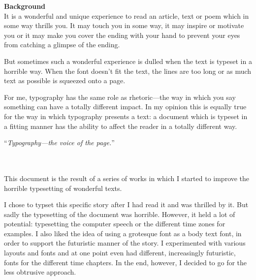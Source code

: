 \thispagestyle{empty}
{
\parindent0mm
\pagestyle{empty}
\raggedbottom
\newpage

\textbf{Background}\\


It is a wonderful and unique experience to read an article, text or poem
which in some way thrills you. It may touch you in some way, it may inspire
or motivate you or it may make you cover the ending with your hand to
prevent your eyes from catching a glimpse of the ending.

But sometimes such a wonderful experience is dulled when the text is typeset 
in a horrible way. When the font doesn't fit the text, the lines are too
long or as much text as possible is squeezed onto a page.

For me, typography has the same role as rhetoric---the way in which
you say something can have a totally different impact. In my opinion this 
is equally true for the way in which typography presents a text:
a document which is typeset in a fitting manner has the ability to affect 
the reader in a totally different way.

\begin{center}
	``\textit{Typography---the voice of the page.}''
\end{center}

\pagebreak

\ \\ \ \\
This document is the result of a series of works in which I started to improve
the horrible typesetting of wonderful texts.

I chose to typset this specific story after I had read it and was thrilled
by it. But sadly the typesetting of the document was horrible. 
However, it held a lot of potential: typesetting the computer speech or the different 
time zones for examples. 
I also liked the idea of using a grotesque font as a body text font, in
order to support the futuristic manner of the story.
I experimented with various layouts and fonts and at one point even had
different, increasingly futuristic, fonts for the different time chapters.
In the end, however, I decided to go for the less obtrusive approach.

\pagebreak
\ \\
\pagebreak
\ \\



\pagebreak
}

